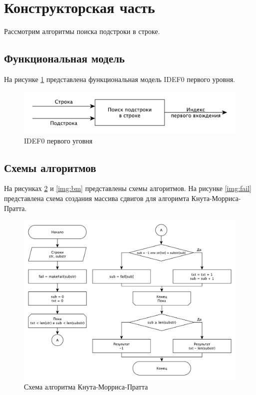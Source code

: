 \documentclass[a4paper,12pt]{article}
\begin{document}
\newpage
\section{Конструкторская часть}

Рассмотрим алгоритмы поиска подстроки в строке.

\subsection{Функциональная модель}

На рисунке \ref{img:idef0} представлена функциональная модель IDEF0
первого уровня.

\begin{figure}[H]
    \centering
    \includegraphics[scale=0.9]{idef0}
    \caption{IDEF0 первого уговня}
    \label{img:idef0}
\end{figure}

\subsection{Схемы алгоритмов}

На рисунках \ref{img:kmp} и \ref{img:bm} представлены схемы алгоритмов.
На рисунке \ref{img:fail} представлена схема создания массива сдвигов
для алгоримта Кнута-Морриса-Пратта.

\begin{figure}[H]
    \centering
    \includegraphics[scale=0.65]{knuth_morris_pratt}
    \caption{Схема алгоритма Кнута-Морриса-Пратта}
    \label{img:kmp}
\end{figure}
\end{document}
